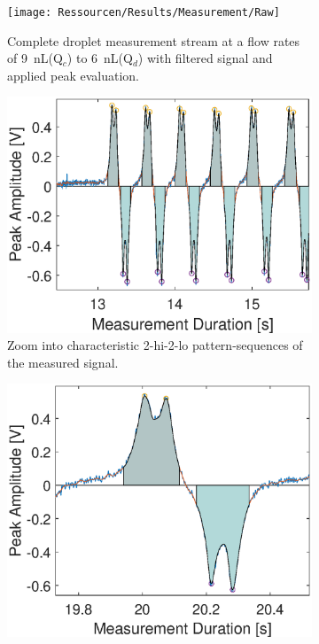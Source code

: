 \begin{figure}[h]
	\begin{subfigure}[c]{\textwidth} 
		\centering
		\texttt{[image: Ressourcen/Results/Measurement/Raw]}
		\caption{Complete droplet measurement stream at a flow rates of \SI{9}{\nano\liter}(Q$_c$) to \SI{6}{\nano\liter}(Q$_d$) with filtered signal and applied peak evaluation.}
		\label{fig:exp:raw}
	\end{subfigure}
	\vfill
	\begin{subfigure}[l]{.49\textwidth} 
		\centering
		\includegraphics[clip,trim={0mm .5mm 0mm 0mm},width=\linewidth]{Ressourcen/Results/Measurement/Raw_in}
		\caption{Zoom into characteristic 2-hi-2-lo pattern-sequences of the measured signal.}
		\label{fig:exp:peaks}
	\end{subfigure}
	\hfill
\begin{subfigure}[r]{.49\textwidth} 
	\centering
	\includegraphics[clip,trim={0mm .5mm 0mm 0mm},width=\linewidth]{Ressourcen/Results/Measurement/Pattern}

\end{subfigure}
\end{figure}
